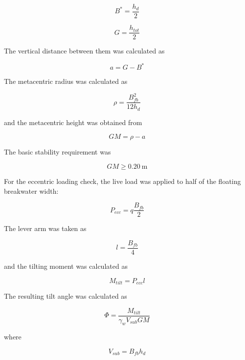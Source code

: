 \documentclass[a4paper, 11pt]{article}
\begin{document}
\begin{equation}
    B^*=\frac{h_d}{2}
\end{equation}

\begin{equation}
    G=\frac{h_{tot}}{2}
\end{equation}

The vertical distance between them was calculated as

\begin{equation}
    a=G-B^*
\end{equation}

The metacentric radius was calculated as

\begin{equation}
    \rho=\frac{B_{fb}^{2}}{12h_d}
\end{equation}

and the metacentric height was obtained from

\begin{equation}
    GM=\rho-a
\end{equation}

The basic stability requirement was

\begin{equation}
    GM\geq0.20~\mathrm{m}
\end{equation}

For the eccentric loading check, the live load was applied to half of the floating breakwater width:

\begin{equation}
    P_{ecc}=q\frac{B_{fb}}{2}
\end{equation}

The lever arm was taken as

\begin{equation}
    l=\frac{B_{fb}}{4}
\end{equation}

and the tilting moment was calculated as

\begin{equation}
    M_{tilt}=P_{ecc}l
\end{equation}

The resulting tilt angle was calculated as

\begin{equation}
    \Phi=
    \frac{M_{tilt}}
    {\gamma_w V_{sub}GM}
\end{equation}

where

\begin{equation}
    V_{sub}=B_{fb}h_d
\end{equation}
\end{document}
